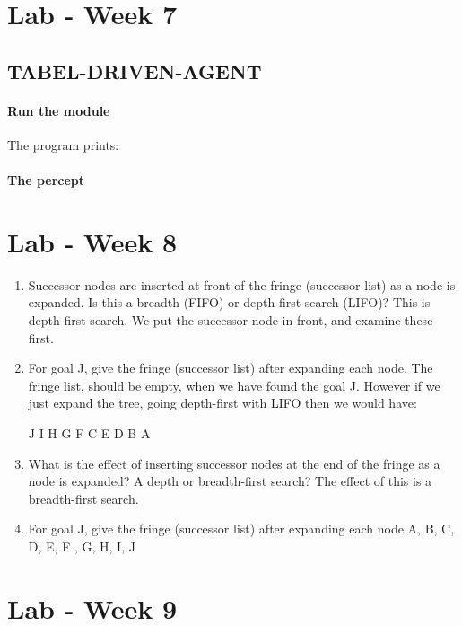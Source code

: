 \documentclass{article}
\begin{document}
\section{Lab - Week 7}%
\label{sec:lab_week_7}

\subsection{TABEL-DRIVEN-AGENT}%
\label{sub:tabel_driven_agent}

\paragraph{Run the module}
The program prints:

\paragraph{The percept }

\section{Lab - Week 8}%
\label{sec:lab_week_8}

\begin{enumerate}
  \item Successor nodes are inserted at front of the fringe (successor list) as
    a node is expanded. Is this a breadth (FIFO) or depth-first search (LIFO)?
    \subitem This is depth-first search. We put the successor node in front, and
    examine these first.

  \item For goal J, give the fringe (successor list) after expanding each node.
    \subitem The fringe list, should be empty, when we have found the goal J.
    However if we just expand the tree, going depth-first with LIFO then we
    would have: 
    \begin{center}
      J I H G F C E D B A 
    \end{center}
  \item What is the effect of inserting successor nodes at the end of the fringe
    as a node is expanded? A depth or breadth-first search?
    \subitem The effect of this is a breadth-first search.
  \item For goal J, give the fringe (successor list) after expanding each node
    \subitem A, B, C, D, E, F , G, H, I, J
\end{enumerate}

\section{Lab - Week 9}%
\label{sec:lab_week_9}
\end{document}
